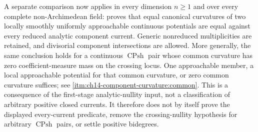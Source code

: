 A separate comparison now applies in every dimension $n\geq1$ and over
every complete non-Archimedean field:
 proves that equal canonical
curvatures of two locally smoothly uniformly approachable continuous
potentials are equal against every reduced analytic component current.
Generic nonreduced multiplicities are retained, and divisorial
component intersections are allowed.  More generally, the same conclusion
holds for a continuous $\operatorname{CPsh}$ pair whose common curvature
has zero coefficient-measure mass on the crossing locus.  One approachable
member, a local approachable potential for that common curvature, or
zero common curvature suffices; see
\cref{itm:ch14-component-curvature:common}.
This is a consequence of the first-stage analytic-nullity input, not a
classification of arbitrary positive closed currents.  It therefore does
not by itself prove the displayed every-current predicate, remove the
crossing-nullity hypothesis for arbitrary $\operatorname{CPsh}$ pairs,
or settle positive bidegrees.


